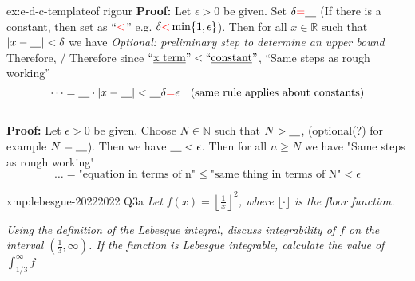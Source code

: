 \documentclass[landscape, 8pt]{extarticle}
\begin{document}
\begin{multicols}{3}
\begin{xmp}{ex:e-d-c-template}{of rigour}
	\vspace{5pt}
    \textbf{Proof:} Let $\epsilon > 0$ be given. Set $\delta {\color{red}=}\text{\underline{\quad}}$ (If there is a constant, then set as ``${\color{red}<}$'' e.g. $\delta {\color{red}<}\min\{1,\epsilon\}$). Then for all $x\in \mathbb{R}$ such that $\lvert x - \text{\underline{\quad}}\rvert < \delta$ we have
    \textit{Optional: preliminary step to determine an upper bound}
    \vspace{0pt}\newline
    Therefore, / Therefore since $\text{``\underline{x term}''} < \text{``\underline{constant}''}$,
    \vspace{0pt}\newline
    ``Same steps as rough working''
    \[\dots = \text{\underline{\quad}} \cdot \lvert x - \text{\underline{\quad}}\rvert < \text{\underline{\quad}}\delta {\color{red}=} \epsilon \quad\text{(same rule applies about constants)}\]
    \hrule
    \vspace{3pt}
    \noindent\textbf{Proof:} Let $\epsilon > 0$ be given. Choose $N\in \mathbb{N}$ such that $N > \text{\underline{\quad}}$, (optional(?) for example $N=\text{\underline{\quad}}$). Then we have $\text{\underline{\quad}}<\epsilon$. Then for all $n\ge N$ we have
    \vspace{0pt}\newline
    "Same steps as rough working"
    \[\dots = \text{"equation in terms of n"} \le \text{"same thing in terms of N"} < \epsilon\]
\end{xmp}

\begin{xmp}{xmp:lebesgue-2022}{2022 Q3a}
	\textit{Let $\displaystyle f(x) = \left\lfloor \frac{1}{x} \right\rfloor^{2}$, where $\lfloor \cdot \rfloor$ is the floor function.}

	\textit{Using the definition of the Lebesgue integral, discuss integrability of $f$ on the interval $( \frac{1}{3}, \infty)$. If the function is Lebesgue integrable, calculate the value of $\int_{ 1 /3}^{\infty}f$}

	\vspace{-2pt}
	\begin{center}
\end{center}
\end{xmp}
\end{multicols}
\end{document}
